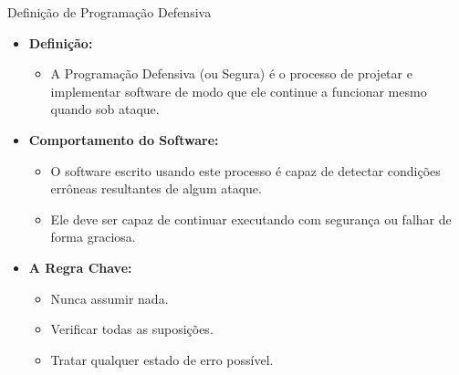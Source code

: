 \begin{frame}{Definição de Programação Defensiva}
    \begin{itemize}
        \item \textbf{Definição:}
              \begin{itemize}
                  \item A Programação Defensiva (ou Segura) é o processo de projetar e implementar software de modo que ele continue a funcionar mesmo quando sob ataque.
              \end{itemize}

        \item \textbf{Comportamento do Software:}
              \begin{itemize}
                  \item O software escrito usando este processo é capaz de detectar condições errôneas resultantes de algum ataque.
                  \item Ele deve ser capaz de continuar executando com segurança ou falhar de forma graciosa.
              \end{itemize}

        \item \textbf{A Regra Chave:}
              \begin{itemize}
                  \item Nunca assumir nada.
                  \item Verificar todas as suposições.
                  \item Tratar qualquer estado de erro possível.
              \end{itemize}
    \end{itemize}
\end{frame}

